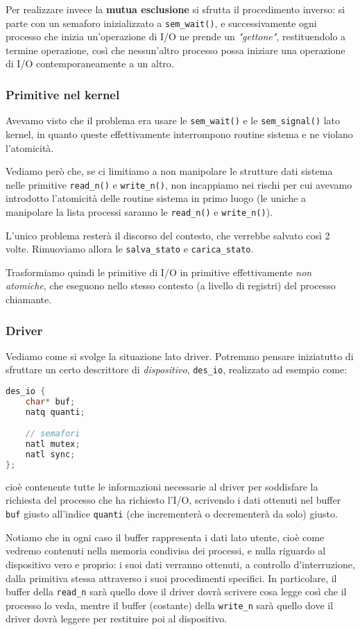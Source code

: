 \documentclass[a4paper,11pt]{article}
\begin{document}
Per realizzare invece la \textbf{mutua esclusione} si sfrutta il procedimento inverso: si parte con un semaforo inizializzato a \lstinline|sem_wait()|, e successivamente ogni processo che inizia un'operazione di I/O ne prende un \textit{"gettone"}, restituendolo a termine operazione, così che nessun'altro processo possa iniziare una operazione di I/O contemporaneamente a un altro.

\subsubsection{Primitive nel kernel}
Avevamo visto che il problema era usare le \lstinline|sem_wait()| e le \lstinline|sem_signal()| lato kernel, in quanto queste effettivamente interrompono routine sistema e ne violano l'atomicità.

Vediamo però che, se ci limitiamo a non manipolare le strutture dati sistema nelle primitive \lstinline|read_n()| e \lstinline|write_n()|, non incappiamo nei rischi per cui avevamo introdotto l'atomicità delle routine sistema in primo luogo (le uniche a manipolare la lista processi saranno le \lstinline|read_n()| e \lstinline|write_n()|).

L'unico problema resterà il discorso del contesto, che verrebbe salvato così 2 volte.
Rimuoviamo allora le \lstinline|salva_stato| e \lstinline|carica_stato|.

Trasformiamo quindi le primitive di I/O in primitive effettivamente \textit{non atomiche}, che eseguono nello stesso contesto (a livello di registri) del processo chiamante.

\subsubsection{Driver}
Vediamo come si svolge la situazione lato driver.
Potremmo pensare iniziatutto di sfruttare un certo descrittore di \textit{dispositivo}, \lstinline|des_io|, realizzato ad esempio come:
\begin{lstlisting}[language=C++, style=codestyle]	
des_io {
	char* buf;
	natq quanti;

	// semafori
	natl mutex;
	natl sync;
};
\end{lstlisting}
cioè contenente tutte le informazioni necessarie al driver per soddisfare la richiesta del processo che ha richiesto l'I/O, scrivendo i dati ottenuti nel buffer \lstinline|buf| giusto all'indice \lstinline|quanti| (che incrementerà o decrementerà da solo) giusto.

Notiamo che in ogni caso il buffer rappresenta i dati lato utente, cioè come vedremo contenuti nella memoria condivisa dei processi, e nulla riguardo al dispositivo vero e proprio: i suoi dati verranno ottenuti, a controllo d'interruzione, dalla primitiva stessa attraverso i suoi procedimenti specifici.
In particolare, il buffer della \lstinline|read_n| sarà quello dove il driver dovrà scrivere cosa legge così che il processo lo veda, mentre il buffer (costante) della \lstinline|write_n| sarà quello dove il driver dovrà leggere per restituire poi al dispositivo.
\end{document}
